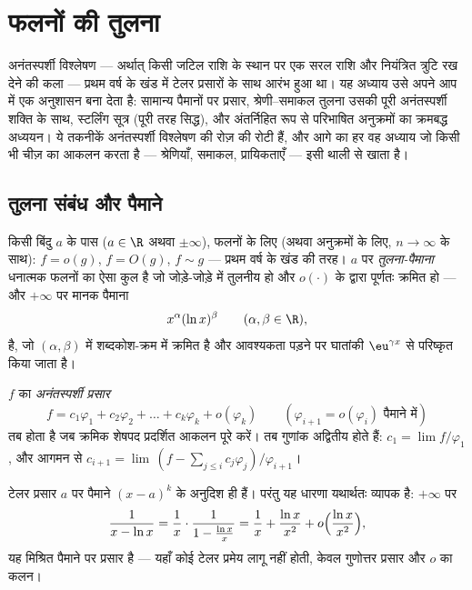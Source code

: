 \chapter{फलनों की तुलना}\label{ch:b2:comparison}

अनंतस्पर्शी विश्लेषण --- अर्थात् किसी जटिल राशि के स्थान पर एक सरल राशि
और नियंत्रित त्रुटि रख देने की कला --- प्रथम वर्ष के खंड में टेलर
प्रसारों के साथ आरंभ हुआ था। यह अध्याय उसे अपने आप में एक अनुशासन बना
देता है: सामान्य पैमानों पर प्रसार, श्रेणी--समाकल तुलना उसकी पूरी
अनंतस्पर्शी शक्ति के साथ, स्टर्लिंग सूत्र (पूरी तरह सिद्ध), और अंतर्निहित
रूप से परिभाषित अनुक्रमों का क्रमबद्ध अध्ययन। ये तकनीकें अनंतस्पर्शी
विश्लेषण की रोज़ की रोटी हैं, और आगे का हर वह अध्याय जो किसी भी चीज़ का
आकलन करता है --- श्रेणियाँ, समाकल, प्रायिकताएँ --- इसी थाली से खाता है।

\section{तुलना संबंध और पैमाने}

\begin{definition}\label{def:b2:comparison:landau}
किसी बिंदु $a$ के पास ($a \in \R$ अथवा $\pm\infty$), फलनों के लिए (अथवा अनुक्रमों के
लिए, $n \to \infty$ के साथ): $f = o(g)$, $f = O(g)$, $f \sim g$ --- प्रथम वर्ष के खंड की तरह। $a$ पर
\emph{तुलना-पैमाना} धनात्मक फलनों का ऐसा कुल है जो
जोड़े-जोड़े में तुलनीय हो और $o(\cdot)$ के द्वारा पूर्णतः क्रमित हो --- और $+\infty$
पर मानक पैमाना
\[
x^{\alpha} (\ln x)^{\beta}
\qquad (\alpha, \beta \in \R),
\]
है, जो $(\alpha, \beta)$ में शब्दकोश-क्रम में क्रमित है और आवश्यकता पड़ने पर
घातांकी $\eu^{\gamma x}$ से परिष्कृत किया जाता है।
\end{definition}

\begin{definition}[अनंतस्पर्शी प्रसार]\label{def:b2:comparison:expansion}
$f$ का \emph{अनंतस्पर्शी प्रसार}
\[
f = c_1 \varphi_1 + c_2\varphi_2 + \dots + c_k \varphi_k +
o(\varphi_k)
\qquad (\varphi_{i+1} = o(\varphi_i) \text{ पैमाने में})
\]
तब होता है जब क्रमिक शेषपद प्रदर्शित आकलन पूरे करें। तब गुणांक अद्वितीय
होते हैं: $c_1 = \lim f/\varphi_1$, और आगमन से $c_{i+1} = \lim\,(f - \sum_{j \leq i}
c_j\varphi_j)/\varphi_{i+1}$।
\end{definition}

\begin{example}
टेलर प्रसार $a$ पर पैमाने $(x -
a)^k$ के अनुदिश  ही हैं। परंतु
यह धारणा यथार्थतः व्यापक है: $+\infty$ पर
\[
\frac{1}{x - \ln x}
= \frac1x \cdot \frac{1}{1 - \frac{\ln x}{x}}
= \frac1x + \frac{\ln x}{x^2} + o\Bigl(\frac{\ln x}{x^2}\Bigr),
\]
यह मिश्रित पैमाने पर प्रसार है --- यहाँ कोई टेलर प्रमेय लागू नहीं होती,
केवल गुणोत्तर प्रसार और $o$ का कलन।
\end{example}

